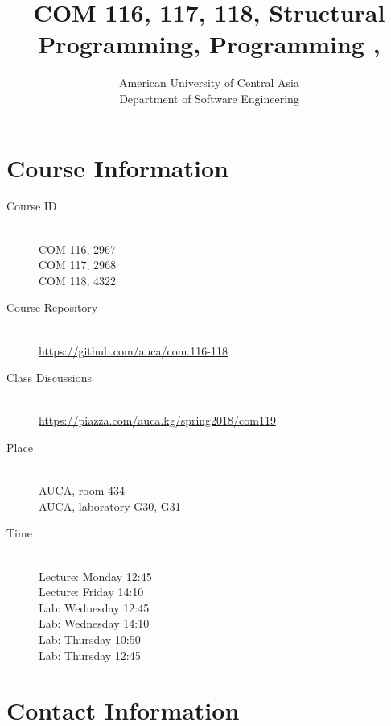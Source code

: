 \documentclass[12pt,a4paper,oneside]{article}
\newcommand{\R}[1]{\uppercase\expandafter{\romannumeral #1\relax}}
\begin{document}
    \title{COM 116, 117, 118, Structural Programming, Programming \R{1}, \R{2}}
    \author{
        American University of Central Asia\\
        Department of Software Engineering
    }
    \date{}
    \maketitle

    \section{Course Information}

        \begin{description}
            \item[Course ID]\hfill\\
                COM 116, 2967\\
                COM 117, 2968\\
                COM 118, 4322
            \item[Course Repository]\hfill\\
                \url{https://github.com/auca/com.116-118}
            \item[Class Discussions]\hfill\\
                \url{https://piazza.com/auca.kg/spring2018/com119}
            \item[Place]\hfill\\
                AUCA, room 434\\
                AUCA, laboratory G30, G31
            \item[Time]\hfill\\
                Lecture: Monday 12:45\\
                Lecture: Friday 14:10\\
                Lab: Wednesday 12:45\\
                Lab: Wednesday 14:10\\
                Lab: Thursday 10:50\\
                Lab: Thursday 12:45
        \end{description}

    \section{Contact Information}
\end{document}
